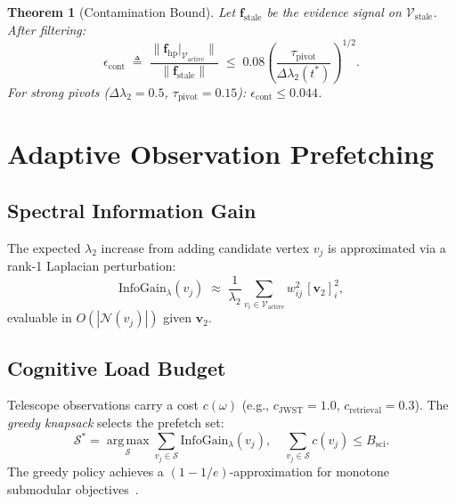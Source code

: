 \documentclass[conference]{IEEEtran}
\newtheorem{theorem}{Theorem}
\newcommand{\lam}{\lambda_2}
\newcommand{\dlam}{\Delta\lambda_2}
\newcommand{\epscont}{\epsilon_{\mathrm{cont}}}
\newcommand{\tpivot}{\tau_{\mathrm{pivot}}}
\newcommand{\Vcal}{\mathcal{V}}
\newcommand{\vv}{\mathbf{v}}
\begin{document}
\begin{theorem}[Contamination Bound]\label{thm:cont}
Let $\mathbf{f}_\mathrm{stale}$ be the evidence signal on $\Vcal_\mathrm{stale}$.
After filtering:
\begin{equation}
  \epscont \;\triangleq\;
  \frac{\|\mathbf{f}_\mathrm{hp}\big|_{\Vcal_\mathrm{active}}\|}
       {\|\mathbf{f}_\mathrm{stale}\|}
  \;\leq\; 0.08\left(\frac{\tpivot}{\dlam(t^*)}\right)^{\!1/2}.
  \label{eq:cont_bound}
\end{equation}
For strong pivots ($\dlam = 0.5$, $\tpivot = 0.15$):
$\epscont \leq 0.044$.
\end{theorem}

\section{Adaptive Observation Prefetching}\label{sec:prefetch}

\subsection{Spectral Information Gain}
The expected $\lam$ increase from adding candidate vertex $v_j$ is
approximated via a rank-1 Laplacian perturbation:
\begin{equation}
  \mathrm{InfoGain}_\lambda(v_j)
  \;\approx\; \frac{1}{\lam}\sum_{v_i\in\Vcal_\mathrm{active}}
  w_{ij}^2\,[\vv_2]_i^2,
  \label{eq:infogain}
\end{equation}
evaluable in $O(|\mathcal{N}(v_j)|)$ given $\vv_2$.

\subsection{Cognitive Load Budget}
Telescope observations carry a cost $c(\omega)$
(e.g., $c_\mathrm{JWST} = 1.0$, $c_\mathrm{retrieval} = 0.3$).
The \emph{greedy knapsack} selects the prefetch set:
\begin{equation}
  \mathcal{S}^* = \operatorname*{arg\,max}_{\mathcal{S}}
  \sum_{v_j\in\mathcal{S}}\mathrm{InfoGain}_\lambda(v_j),\quad
  \sum_{v_j\in\mathcal{S}} c(v_j)\leq B_\mathrm{sci}.
  \label{eq:knapsack}
\end{equation}
The greedy policy achieves a $(1-1/e)$-approximation for monotone
submodular objectives~\cite{nemhauser1978}.

\end{document}
